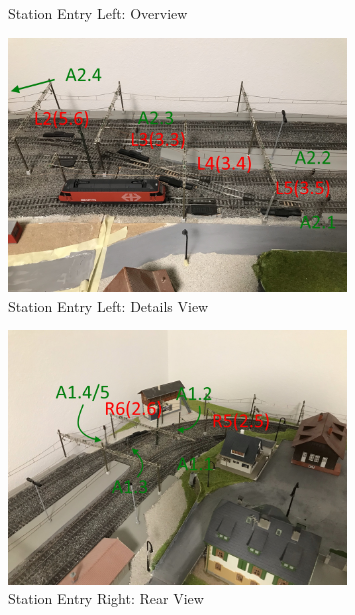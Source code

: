 \documentclass{scrreprt}
\begin{document}
\begin{appendices}
\begin{figure}[h!]
	\caption{Station Entry Left: Overview}
\end{figure}
\begin{figure}[h!]
	\centering
	\includegraphics[width=0.8\textwidth]{ref/left details}
	\caption{Station Entry Left: Details View}
\end{figure}
\begin{figure}[h!]
	\centering
	\includegraphics[width=0.8\textwidth]{ref/right rear}
	\caption{Station Entry Right: Rear View}
\end{figure}
\begin{figure}[h!]
	\centering

\end{figure}
\end{appendices}
\end{document}
